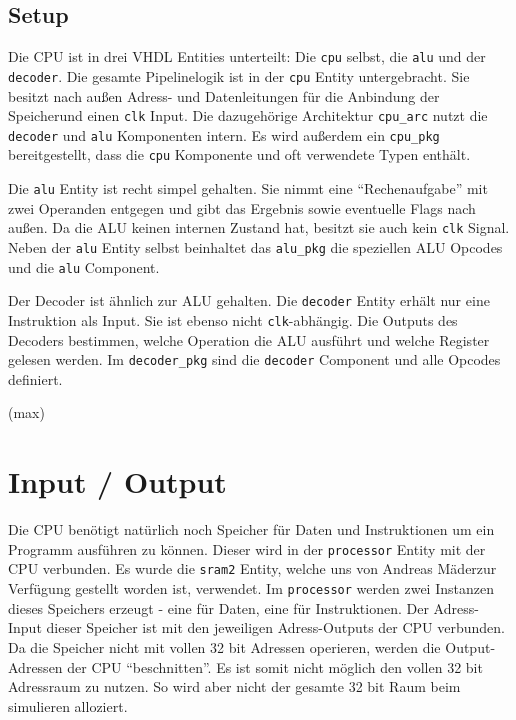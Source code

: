 \documentclass[paper=a4,fontsize=12pt,twocolumn]{scrreprt}
\begin{document}
\subsection{Setup}

Die CPU ist in drei VHDL Entities unterteilt: Die \texttt{cpu} selbst, die \texttt{alu} und der \texttt{decoder}.
Die gesamte Pipelinelogik ist in der \texttt{cpu} Entity untergebracht.
Sie besitzt nach außen Adress- und Datenleitungen für die Anbindung der Speicher\footnotemark und einen \texttt{clk} Input.
Die dazugehörige Architektur \texttt{cpu\_arc} nutzt die \texttt{decoder} und \texttt{alu} Komponenten intern.
Es wird außerdem ein \texttt{cpu\_pkg} bereitgestellt, dass die \texttt{cpu} Komponente und oft verwendete Typen enthält.

Die \texttt{alu} Entity ist recht simpel gehalten.
Sie nimmt eine \enquote{Rechenaufgabe} mit zwei Operanden entgegen und gibt das Ergebnis sowie eventuelle Flags nach außen.
Da die ALU keinen internen Zustand hat, besitzt sie auch kein \texttt{clk} Signal.
Neben der \texttt{alu} Entity selbst beinhaltet das \texttt{alu\_pkg} die speziellen ALU Opcodes und die \texttt{alu} Component.

Der Decoder ist ähnlich zur ALU gehalten.
Die \texttt{decoder} Entity erhält nur eine Instruktion als Input.
Sie ist ebenso nicht \texttt{clk}-abhängig.
Die Outputs des Decoders bestimmen, welche Operation die ALU ausführt und welche Register gelesen werden.
Im \texttt{decoder\_pkg} sind die \texttt{decoder} Component und alle Opcodes definiert.


(max)

\section{Input / Output}

Die CPU benötigt natürlich noch Speicher für Daten und Instruktionen um ein Programm ausführen zu können.
Dieser wird in der \texttt{processor} Entity mit der CPU verbunden.
Es wurde die \texttt{sram2} Entity, welche uns von Andreas Mäder\footnotemark zur Verfügung gestellt worden ist, verwendet.
Im \texttt{processor} werden zwei Instanzen dieses Speichers erzeugt - eine für Daten, eine für Instruktionen.
Der Adress-Input dieser Speicher ist mit den jeweiligen Adress-Outputs der CPU verbunden.
Da die Speicher nicht mit vollen 32 bit Adressen operieren, werden die Output-Adressen der CPU \enquote{beschnitten}.
Es ist somit nicht möglich den vollen 32 bit Adressraum zu nutzen.
So wird aber nicht der gesamte 32 bit Raum beim simulieren alloziert.
\end{document}
